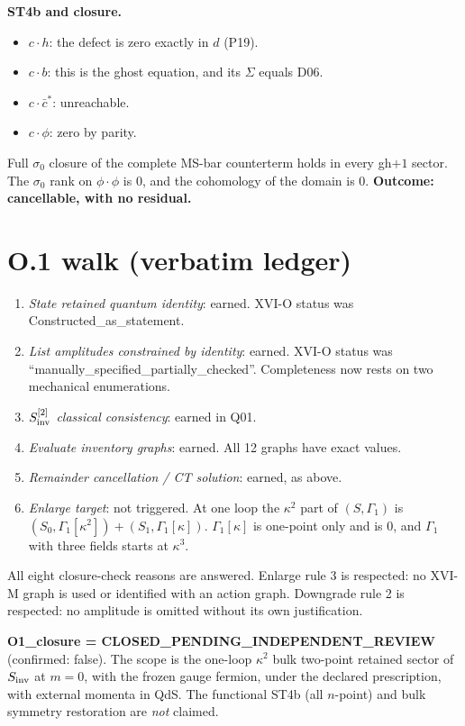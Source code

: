 \textbf{ST4b and closure.}
\begin{itemize}
\item $c\cdot h$: the defect is zero exactly in $d$ (P19).
\item $c\cdot b$: this is the ghost equation, and its $\Sigma$ equals D06.
\item $c\cdot\bar c^*$: unreachable.
\item $c\cdot\phi$: zero by parity.
\end{itemize}
Full $\sigma_0$ closure of the complete MS-bar counterterm holds in every gh$+1$ sector. The $\sigma_0$ rank on
$\phi\!\cdot\!\phi$ is $0$, and the cohomology of the domain is $0$. \textbf{Outcome: cancellable, with no residual.}

\section{O.1 walk (verbatim ledger)}
\begin{enumerate}
\item \emph{State retained quantum identity}: earned. XVI-O status was Constructed\_as\_statement.
\item \emph{List amplitudes constrained by identity}: earned. XVI-O status was ``manually\_specified\_partially\_checked''.
Completeness now rests on two mechanical enumerations.
\item \emph{$S_{\rm inv}^{[2]}$ classical consistency}: earned in Q01.
\item \emph{Evaluate inventory graphs}: earned. All 12 graphs have exact values.
\item \emph{Remainder cancellation / CT solution}: earned, as above.
\item \emph{Enlarge target}: not triggered. At one loop the $\kappa^2$ part of $(S,\Gamma_1)$ is
$(S_0,\Gamma_1[\kappa^2])+(S_1,\Gamma_1[\kappa])$. $\Gamma_1[\kappa]$ is one-point only and is $0$, and $\Gamma_1$ with
three fields starts at $\kappa^3$.
\end{enumerate}
All eight closure-check reasons are answered. Enlarge rule 3 is respected: no XVI-M graph is used or identified with an
action graph. Downgrade rule 2 is respected: no amplitude is omitted without its own justification.

\textbf{O1\_closure = CLOSED\_PENDING\_INDEPENDENT\_REVIEW} (confirmed: false). The scope is the one-loop $\kappa^2$ bulk
two-point retained sector of $S_{\rm inv}$ at $m=0$, with the frozen gauge fermion, under the declared prescription, with
external momenta in QdS. The functional ST4b (all $n$-point) and bulk symmetry restoration are \emph{not} claimed.

